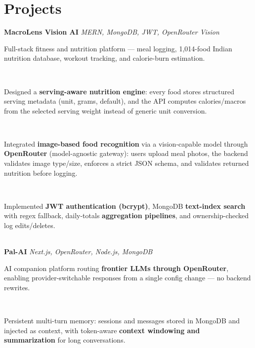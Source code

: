 \documentclass[a4paper,10pt]{article}
\begin{document}
\section{Projects}


\textbf{MacroLens Vision AI} \hfill \textit{MERN, MongoDB, JWT, OpenRouter Vision} \\[-5pt]


\noindent\makebox[1.5em][l]{--}%
\parbox[t]{\dimexpr\linewidth-1.5em\relax}{%
Full-stack fitness and nutrition platform --- meal logging, 1,014-food Indian nutrition database, workout tracking, and calorie-burn estimation.} \\[0pt]


\noindent\makebox[1.5em][l]{--}%
\parbox[t]{\dimexpr\linewidth-1.5em\relax}{%
Designed a \textbf{serving-aware nutrition engine}: every food stores structured serving metadata (unit, grams, default), and the API computes calories/macros from the selected serving weight instead of generic unit conversion.} \\[0pt]


\noindent\makebox[1.5em][l]{--}%
\parbox[t]{\dimexpr\linewidth-1.5em\relax}{%
Integrated \textbf{image-based food recognition} via a vision-capable model through \textbf{OpenRouter} (model-agnostic gateway): users upload meal photos, the backend validates image type/size, enforces a strict JSON schema, and validates returned nutrition before logging.} \\[0pt]


\noindent\makebox[1.5em][l]{--}%
\parbox[t]{\dimexpr\linewidth-1.5em\relax}{%
Implemented \textbf{JWT authentication (bcrypt)}, MongoDB \textbf{text-index search} with regex fallback, daily-totals \textbf{aggregation pipelines}, and ownership-checked log edits/deletes.} \\[6pt]


\textbf{Pal-AI} \hfill \textit{Next.js, OpenRouter, Node.js, MongoDB} \\[-5pt]


\noindent\makebox[1.5em][l]{--}%
\parbox[t]{\dimexpr\linewidth-1.5em\relax}{%
AI companion platform routing \textbf{frontier LLMs through OpenRouter}, enabling provider-switchable responses from a single config change --- no backend rewrites.} \\[0pt]


\noindent\makebox[1.5em][l]{--}%
\parbox[t]{\dimexpr\linewidth-1.5em\relax}{%
Persistent multi-turn memory: sessions and messages stored in MongoDB and injected as context, with token-aware \textbf{context windowing and summarization} for long conversations.} \\[0pt]
\end{document}
